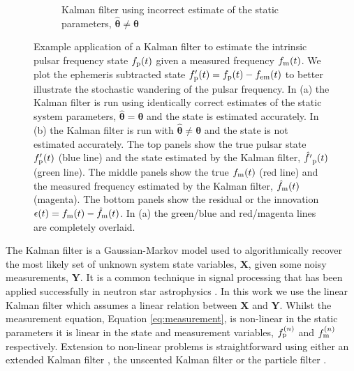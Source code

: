 \documentclass[fleqn,usenatbib,useAMS]{mnras}
\begin{document}
\begin{figure}
\begin{subfigure}[b]{0.49\textwidth}
		\caption{Kalman filter using incorrect estimate of the static parameters, $\hat{\boldsymbol{\theta}} \neq \boldsymbol{\theta}$}
		\label{fig:25MB_bfs}
	\end{subfigure}
	\caption{Example application of a Kalman filter to estimate the intrinsic pulsar frequency state $f_{\rm p}(t)$ given a measured frequency $f_{\rm m}(t)$. We plot the ephemeris subtracted state $f'_{\rm p}(t) = f_{\rm p}(t) - f_{\rm em} (t)$ to better illustrate the stochastic wandering of the pulsar frequency. In (a) the Kalman filter is run using identically correct estimates of the static system parameters, $\hat{\boldsymbol{\theta}} = \boldsymbol{\theta}$ and the state is estimated accurately. In (b) the Kalman filter is run with $\hat{\boldsymbol{\theta}} \neq \boldsymbol{\theta}$ and the state is not estimated accurately. The top panels show the true pulsar state $f'_{\rm p}(t)$ (blue line) and the state estimated by the Kalman filter, $\hat{f'}_{\rm p}(t)$ (green line). The middle panels show the true $f_{\rm m}(t)$ (red line) and the measured frequency estimated  by the Kalman filter, $\hat{f}_{\rm m}(t)$ (magenta). The bottom panels show the residual or the innovation $\epsilon(t) =f_{\rm m}(t) - \hat{f}_{\rm m}(t)$. In (a) the green/blue and red/magenta lines are completely overlaid.}
	\label{fig:four figures}
\end{figure}

The Kalman filter \citep{Kalman1} is a Gaussian-Markov model used to algorithmically recover the most likely set of unknown system state variables, $\boldsymbol{X}$, given some noisy measurements, $\boldsymbol{Y}$. It is a common technique in signal processing that has been applied successfully in neutron star astrophysics \citep[e.g.][]{Meyers2021,Melatos2023}. In this work we use the linear Kalman filter which assumes a linear relation between $\boldsymbol{X}$ and $\boldsymbol{Y}$. Whilst the measurement equation, Equation \eqref{eq:measurement}, is non-linear in the static parameters it is linear in the state and measurement variables, $f_{\rm p}^{(n)}$ and $f_{\rm m}^{(n)}$ respectively. Extension to non-linear problems is straightforward using either an extended Kalman filter \citep{zarchan2000fundamentals}, the unscented Kalman filter \citep{882463van} or the particle filter \citep{Simon10}. \newline 
\end{document}
